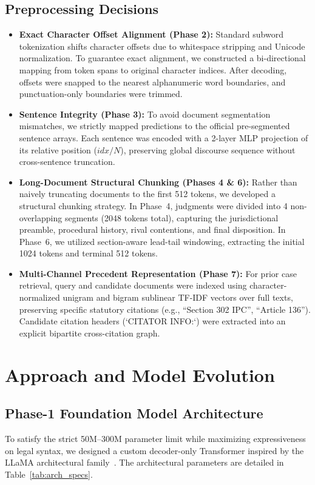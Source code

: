 \documentclass[11pt, oneside]{article}
\begin{document}
\subsection{Preprocessing Decisions}
\begin{itemize}
    \item \textbf{Exact Character Offset Alignment (Phase 2):} Standard subword tokenization shifts character offsets due to whitespace stripping and Unicode normalization. To guarantee exact alignment, we constructed a bi-directional mapping from token spans to original character indices. After decoding, offsets were snapped to the nearest alphanumeric word boundaries, and punctuation-only boundaries were trimmed.
    \item \textbf{Sentence Integrity (Phase 3):} To avoid document segmentation mismatches, we strictly mapped predictions to the official pre-segmented sentence arrays. Each sentence was encoded with a 2-layer MLP projection of its relative position ($idx / N$), preserving global discourse sequence without cross-sentence truncation.
    \item \textbf{Long-Document Structural Chunking (Phases 4 \& 6):} Rather than naively truncating documents to the first 512 tokens, we developed a structural chunking strategy. In Phase~4, judgments were divided into 4 non-overlapping segments (2048 tokens total), capturing the jurisdictional preamble, procedural history, rival contentions, and final disposition. In Phase~6, we utilized section-aware lead-tail windowing, extracting the initial 1024 tokens and terminal 512 tokens.
    \item \textbf{Multi-Channel Precedent Representation (Phase 7):} For prior case retrieval, query and candidate documents were indexed using character-normalized unigram and bigram sublinear TF-IDF vectors over full texts, preserving specific statutory citations (e.g., ``Section 302 IPC'', ``Article 136''). Candidate citation headers (`CITATOR INFO:`) were extracted into an explicit bipartite cross-citation graph.
\end{itemize}

\section{Approach and Model Evolution}

\subsection{Phase-1 Foundation Model Architecture}
To satisfy the strict 50M--300M parameter limit while maximizing expressiveness on legal syntax, we designed a custom decoder-only Transformer inspired by the LLaMA architectural family~\cite{touvron2023llama}. The architectural parameters are detailed in Table~\ref{tab:arch_specs}.
\end{document}
